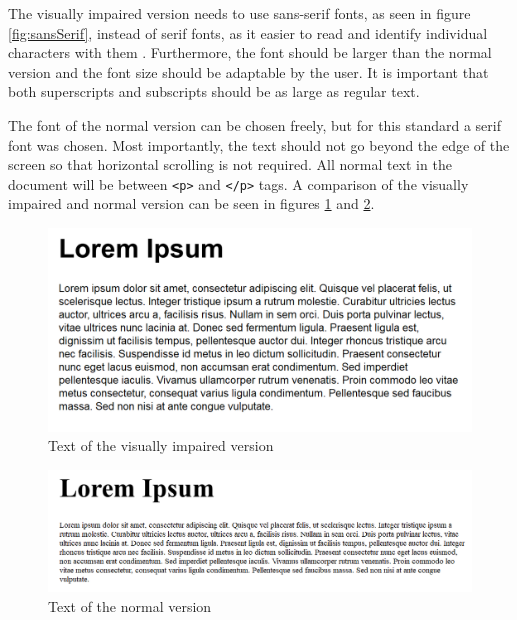 The visually impaired version needs to use sans-serif fonts, as seen in figure \ref{fig:sansSerif}, instead of serif fonts, as it easier to read and identify individual characters with them \cite{pdfBarrierefrei}. Furthermore, the font should be larger than the normal version and the font size should be adaptable by the user. It is important that both superscripts and subscripts should be as large as regular text.



The font of the normal version can be chosen freely, but for this standard a serif font was chosen. Most importantly, the text should not go beyond the edge of the screen so that horizontal scrolling is not required. All normal text in the document will be between \lstinline|<p>| and \lstinline|</p>| tags. A comparison of the visually impaired and normal version can be seen in figures \ref{fig:viText} and \ref{fig:nText}. 

\begin{figure}[H]
	\centering
	\includegraphics[width=\linewidth*21/24]{figures/VItext.png}	
	\vspace{-0.3cm}
	\caption{Text of the visually impaired version \protect\cite{lipsum}}
	\label{fig:viText}
\end{figure}
\vspace{-0.5cm}
\begin{figure}[H]
	\centering
	\includegraphics[width=\linewidth*21/24]{figures/Ntext.png}	
	\vspace{-0.3cm}
	\caption{Text of the normal version \protect\cite{lipsum}}
	\label{fig:nText}
\end{figure}
\vspace{-0.5cm}
